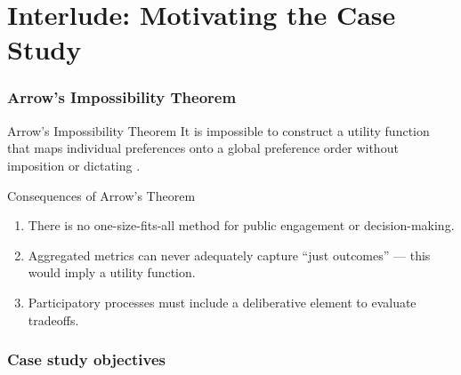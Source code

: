 \section{Interlude: Motivating the Case Study}

\begin{frame}
    \frametitle{Arrow's Impossibility Theorem}
    \begin{block}{Arrow's Impossibility Theorem}
        It is impossible to construct a utility function
        that maps individual preferences onto a global preference
        order without imposition or dictating \cite{arrow_difficulty_1950,franssen_arrows_2005}.
    \end{block}
    \pause
    \begin{block}{Consequences of Arrow's Theorem}
        \begin{enumerate}[<+->]
            \item There is no one-size-fits-all method for public engagement or
            decision-making.
            \item Aggregated metrics can never adequately capture ``just outcomes'' ---
            this would imply a utility function.
            \item Participatory processes must include a deliberative element to evaluate
            tradeoffs.
        \end{enumerate}
    \end{block}

\end{frame}

\begin{frame}
    \frametitle{Case study objectives}

\end{frame}
